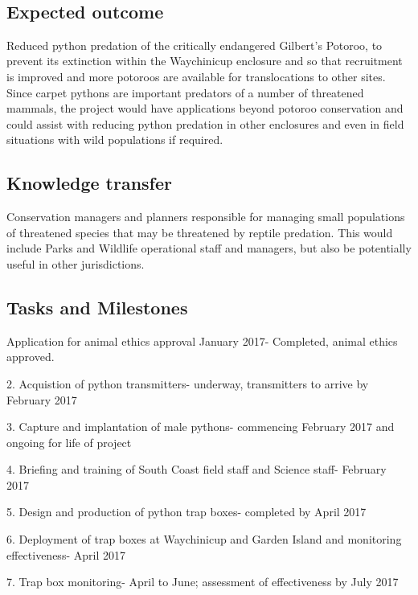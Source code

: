 \documentclass[version=last,
    paper=a4,                               %
    10pt,                                   %
    dvipsnames,
    oneside,                              %
    headings=openany,                       %
    open=any,
    BCOR=7mm,                               %
    DIV=15,     %
]{scrbook}
\begin{document}
~




\subsection*{Expected outcome}

Reduced python predation of the critically endangered Gilbert's Potoroo,
to prevent its extinction within the Waychinicup enclosure and so that
recruitment is improved and more potoroos are available for
translocations to other sites.\\
Since carpet pythons are important predators of a number of threatened
mammals, the project would have applications beyond potoroo conservation
and could assist with reducing python predation in other enclosures and
even in field situations with wild populations if required.




\subsection*{Knowledge transfer}

Conservation managers and planners responsible for managing small
populations of threatened species that may be threatened by reptile
predation. This would include Parks and Wildlife operational staff and
managers, but also be potentially useful in other jurisdictions.~




\subsection*{Tasks and Milestones}

Application for animal ethics approval January 2017- Completed, animal
ethics approved.

2. Acquistion of python transmitters- underway, transmitters to arrive
by February 2017

3. Capture and implantation of male pythons- commencing February 2017
and ongoing for life of project

4. Briefing and training of South Coast field staff and Science staff-
February 2017

5. Design and production of python trap boxes- completed by April 2017

6. Deployment of trap boxes at Waychinicup and Garden Island and
monitoring effectiveness- April 2017

7. Trap box monitoring- April to June; assessment of effectiveness by
July 2017
\end{document}
